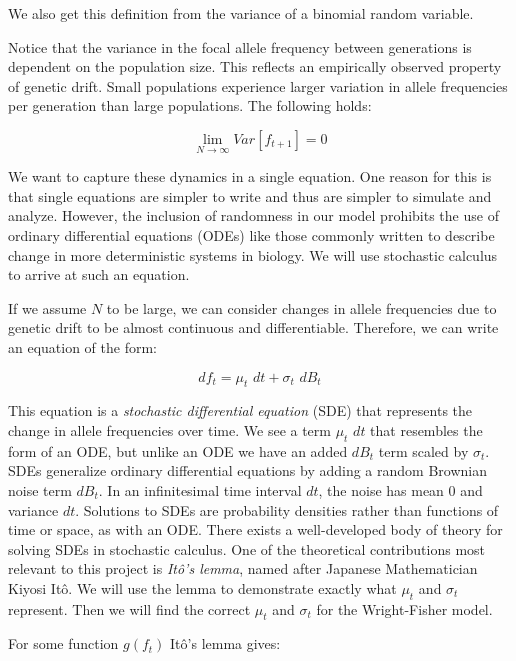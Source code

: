 We also get this definition from the variance of a binomial random variable. 


Notice that the variance in the focal allele frequency between generations is dependent on the population size. This reflects an empirically observed property of genetic drift. Small populations experience larger variation in allele frequencies per generation than large populations. The following holds:

\begin{equation}\label{eq:var_lim_drift}
    \lim_{N \to \infty} Var[f_{t+1}] = 0
\end{equation}

We want to capture these dynamics in a single equation. One reason for this is that single equations are simpler to write and thus are simpler to simulate and analyze. However, the inclusion of randomness in our model prohibits the use of ordinary differential equations (ODEs) like those commonly written to describe change in more deterministic systems in biology. We will use stochastic calculus to arrive at such an equation.


If we assume $N$ to be large, we can consider changes in allele frequencies due to genetic drift to be almost continuous and differentiable. Therefore, we can write an equation of the form: 

\begin{equation}
    df_t = \mu_t \, \,dt + \sigma_t \, \,dB_t
\end{equation}


This equation is a \textit{stochastic differential equation} (SDE) that represents the change in allele frequencies over time. We see a term $\mu_t \, \, dt$ that resembles the form of an ODE, but unlike an ODE we have an added $dB_t$ term scaled by $\sigma_t$. SDEs generalize ordinary differential equations by adding a random Brownian noise term $dB_{t}$. In an infinitesimal time interval $dt$, the noise has mean $0$ and variance $dt$. Solutions to SDEs are probability densities rather than functions of time or space, as with an ODE. There exists a well-developed body of theory for solving SDEs in stochastic calculus. One of the theoretical contributions most relevant to this project is \textit{It\^{o}'s lemma}, named after Japanese Mathematician Kiyosi It\^{o}. \cite{ito_stochastic_1944} We will use the lemma to demonstrate exactly what $\mu_t$ and $\sigma_t$ represent. Then we will find the correct $\mu_t$ and $\sigma_t$ for the Wright-Fisher model. 


For some function $g(f_t)$ It\^{o}'s lemma gives:

